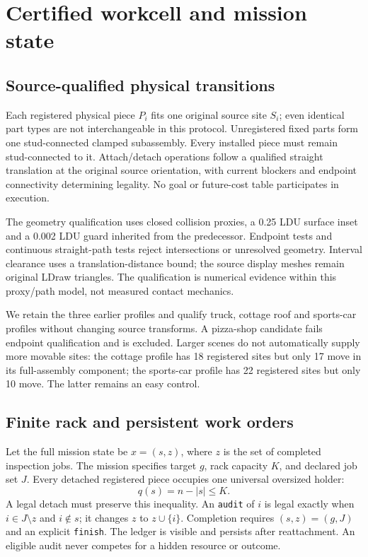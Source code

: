 \documentclass[10pt,twocolumn]{article}
\begin{document}
\section{Certified workcell and mission state}
\label{sec:mission}
\subsection{Source-qualified physical transitions}
Each registered physical piece $P_i$ fits one original source site $S_i$;
even identical part types are not interchangeable in this protocol.
Unregistered fixed parts form one stud-connected clamped subassembly.
Every installed piece must remain stud-connected to it. Attach/detach
operations follow a qualified straight translation at the original source
orientation, with current blockers and endpoint connectivity determining
legality. No goal or future-cost table participates in execution.

The geometry qualification uses closed collision proxies, a 0.25 LDU
surface inset and a 0.002 LDU guard inherited from the predecessor.
Endpoint tests and continuous straight-path tests reject intersections
or unresolved geometry. Interval clearance uses a translation-distance
bound; the source display meshes remain original LDraw triangles.
The qualification is numerical evidence within this proxy/path model,
not measured contact mechanics.

We retain the three earlier profiles and qualify truck, cottage roof and
sports-car profiles without changing source transforms. A pizza-shop
candidate fails endpoint qualification and is excluded. Larger scenes do
not automatically supply more movable sites: the cottage profile has
18 registered sites but only 17 move in its full-assembly component;
the sports-car profile has 22 registered sites but only 10 move.
The latter remains an easy control.

\begin{table}[t]
\centering\small
\caption{Source census. ``Parts'' counts the retained source subassembly,
not necessarily the complete source kit. ``Move'' counts registered sites
that can move in the full-assembly component with unlimited rack capacity.
``Rack'' is the finite challenge capacity; D1 controls may use a larger rack.}

\label{tab:sources}
\end{table}

\subsection{Finite rack and persistent work orders}
Let the full mission state be $x=(s,z)$, where $z$ is the set of completed
inspection jobs. The mission specifies target $g$, rack capacity $K$, and
declared job set $J$. Every detached registered piece occupies one
universal oversized holder:
\[
q(s)=n-|s|\leq K.
\]
A legal detach must preserve this inequality. An \texttt{audit} of $i$
is legal exactly when $i\in J\setminus z$ and $i\notin s$; it changes
$z$ to $z\cup\{i\}$. Completion requires $(s,z)=(g,J)$ and an explicit
\texttt{finish}. The ledger is visible and persists after reattachment.
An eligible audit never competes for a hidden resource or outcome.
\end{document}
